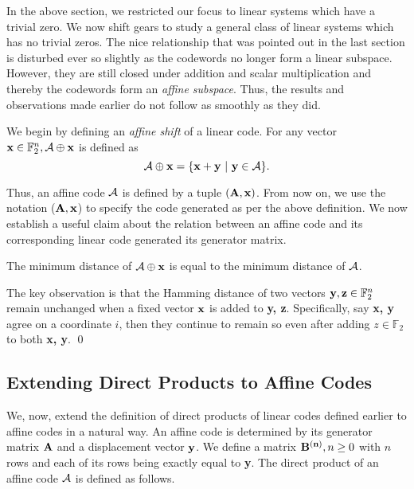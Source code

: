 {In the above section, we restricted our focus to linear systems which
have a trivial zero. We now shift gears to study a general class of
linear systems which has no trivial zeros. The nice relationship that
was pointed out in the last section is disturbed ever so slightly as
the codewords no longer form a linear subspace. However, they are
still closed under addition and scalar multiplication and thereby the
codewords form an {\em affine subspace}. Thus, the results and
observations made earlier do not follow as smoothly as they did.

\noindent We begin by defining an {\em affine shift} of a linear
code. For any vector ${\bf x} \in \mathbb{F}_2^{n}, {\cal A} \oplus {\bf x}$
is defined as
\[
        {\cal A} \oplus {\bf x} = \{{\bf x + y ~|~ y} \in {\cal A} \}.
\]

Thus, an affine code ${\cal A}$ is defined by a tuple $({\bf A, x})$. From
now on, we use the notation \A(${\bf A, x}$) to specify the code
generated as per the above definition. We now establish a useful claim
about the relation between an affine code and its corresponding linear
code generated its generator matrix.

\begin{claim} \label{ind}
The minimum distance of ${\cal A} \oplus {\bf x}$ is equal to the minimum distance of ${\cal A}$.
\end{claim}
 The key observation is that the Hamming
distance of two vectors ${\bf y, z} \in {\mathbb{F}}_{2}^{n}$ remain
unchanged when a fixed vector ${\bf x}$ is added to {\bf y,
  z}. Specifically, say {\bf x, y} agree on a coordinate $i$, then
they continue to remain so even after adding $z \in \mathbb{F}_2$ to
both {\bf x, y}. \qed


\subsection{Extending Direct Products to Affine Codes}
We, now, extend the definition of direct products of linear codes
defined earlier to affine codes in a natural way. An affine code is
determined by its generator matrix ${\bf A}$ and a displacement vector
${\bf y}$. We define a matrix ${\bf B^{(n)}}, n \ge 0$ with $n$ rows
and each of its rows being exactly equal to {\bf y}. The direct
product of an affine code ${\cal A}$ is defined as follows.

}
